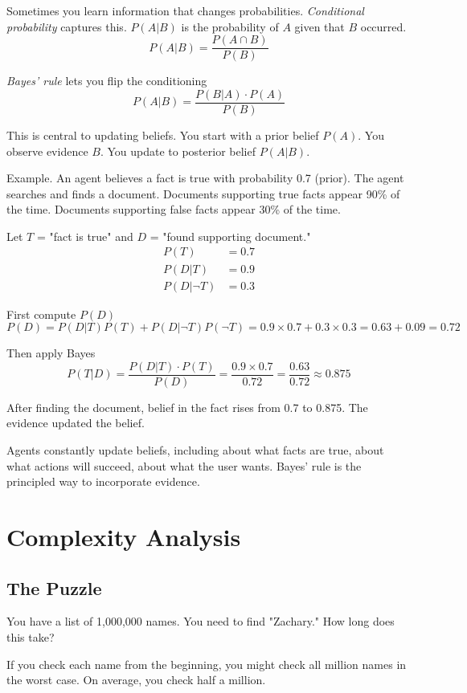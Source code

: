 Sometimes you learn information that changes probabilities. \textit{Conditional probability} captures this. $P(A|B)$ is the probability of $A$ given that $B$ occurred.
\[
P(A|B) = \frac{P(A \cap B)}{P(B)}
\]

\textit{Bayes' rule} lets you flip the conditioning
\[
P(A|B) = \frac{P(B|A) \cdot P(A)}{P(B)}
\]

This is central to updating beliefs. You start with a prior belief $P(A)$. You observe evidence $B$. You update to posterior belief $P(A|B)$.

Example. An agent believes a fact is true with probability 0.7 (prior). The agent searches and finds a document. Documents supporting true facts appear 90\% of the time. Documents supporting false facts appear 30\% of the time.

Let $T$ = "fact is true" and $D$ = "found supporting document."
\begin{align*}
P(T) &= 0.7 \\
P(D|T) &= 0.9 \\
P(D|\neg T) &= 0.3
\end{align*}

First compute $P(D)$
\[
P(D) = P(D|T)P(T) + P(D|\neg T)P(\neg T) = 0.9 \times 0.7 + 0.3 \times 0.3 = 0.63 + 0.09 = 0.72
\]

Then apply Bayes
\[
P(T|D) = \frac{P(D|T) \cdot P(T)}{P(D)} = \frac{0.9 \times 0.7}{0.72} = \frac{0.63}{0.72} \approx 0.875
\]

After finding the document, belief in the fact rises from 0.7 to 0.875. The evidence updated the belief.

Agents constantly update beliefs, including about what facts are true, about what actions will succeed, about what the user wants. Bayes' rule is the principled way to incorporate evidence.

\section{Complexity Analysis}

\subsection{The Puzzle}

You have a list of 1,000,000 names. You need to find "Zachary." How long does this take?

If you check each name from the beginning, you might check all million names in the worst case. On average, you check half a million.

